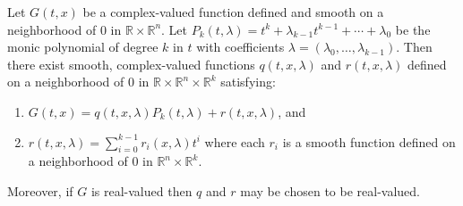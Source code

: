 Let $G(t, x)$ be a complex-valued function defined and smooth on a neighborhood of $0$ in $\mathbb{R} \times \mathbb{R}^n$. Let $P_k(t, \lambda) = t^k + \lambda_{k-1} t^{k-1} + \cdots + \lambda_0$ be the monic polynomial of degree $k$ in $t$ with coefficients $\lambda = (\lambda_0, \ldots, \lambda_{k-1})$. Then there exist smooth, complex-valued functions $q(t, x, \lambda)$ and $r(t, x, \lambda)$ defined on a neighborhood of $0$ in $\mathbb{R} \times \mathbb{R}^n \times \mathbb{R}^k$ satisfying:

\begin{enumerate}
\item[(i)] $G(t, x) = q(t, x, \lambda) P_k(t, \lambda) + r(t, x, \lambda)$, and
\item[(ii)] $\displaystyle r(t, x, \lambda) = \sum_{i=0}^{k-1} r_i(x, \lambda) t^i$ where each $r_i$ is a smooth function defined on a neighborhood of $0$ in $\mathbb{R}^n \times \mathbb{R}^k$.
\end{enumerate}

Moreover, if $G$ is real-valued then $q$ and $r$ may be chosen to be real-valued.
